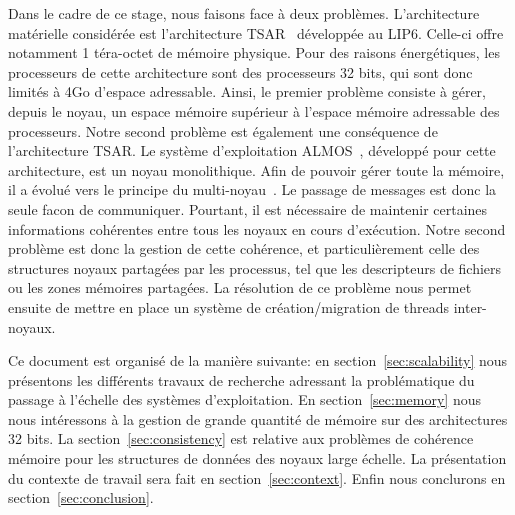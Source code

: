   \hspace{1cm}Dans le cadre de ce stage, nous faisons face à deux
  problèmes. L'architecture matérielle considérée est l'architecture
  TSAR~\citep{greiner2009tsar} développée au LIP6. Celle-ci offre notamment 1
  téra-octet de mémoire physique. Pour des raisons énergétiques, les processeurs
  de cette architecture sont des processeurs 32 bits, qui sont donc limités à
  4Go d'espace adressable. Ainsi, le premier problème consiste à gérer, depuis
  le noyau, un espace mémoire supérieur à l'espace mémoire adressable des
  processeurs. Notre second problème est également une conséquence de
  l'architecture TSAR. Le système d'exploitation
  ALMOS~\citep{almaless2011almos}, développé pour cette architecture, est un
  noyau monolithique. Afin de pouvoir gérer toute la mémoire, il a évolué vers
  le principe du multi-noyau~\cite{schupbach2008embracing}. Le passage de
  messages est donc la seule facon de communiquer. Pourtant, il est nécessaire
  de maintenir certaines informations cohérentes entre tous les noyaux en cours
  d'exécution. Notre second problème est donc la gestion de cette cohérence, et
  particulièrement celle des structures noyaux partagées par les processus, tel
  que les descripteurs de fichiers ou les zones mémoires partagées. La
  résolution de ce problème nous permet ensuite de mettre en place un système de
  création/migration de threads inter-noyaux.\newline

  \hspace{1cm}Ce document est organisé de la manière suivante: en
  section~\ref{sec:scalability} nous présentons les différents travaux de
  recherche adressant la problématique du passage à l'échelle des systèmes
  d'exploitation. En section~\ref{sec:memory} nous nous intéressons à la gestion
  de grande quantité de mémoire sur des architectures 32 bits. La
  section~\ref{sec:consistency} est relative aux problèmes de cohérence mémoire
  pour les structures de données des noyaux large échelle. La présentation du
  contexte de travail sera fait en section~\ref{sec:context}. Enfin nous
  conclurons en section~\ref{sec:conclusion}.
